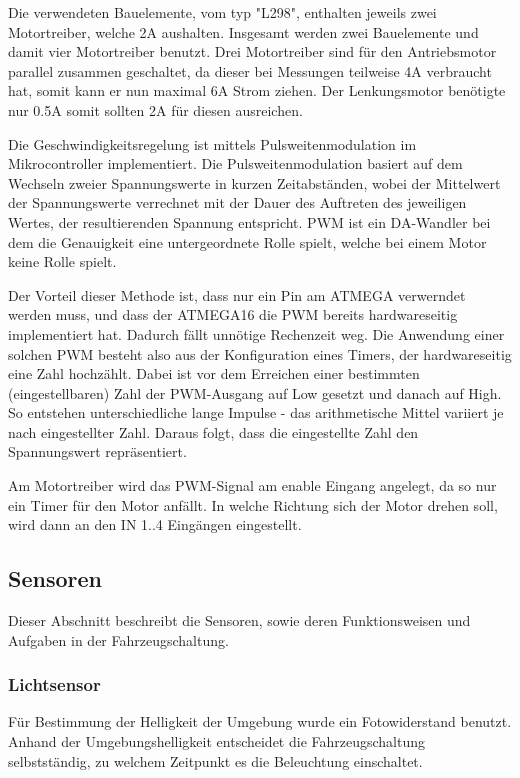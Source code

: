 \documentclass{scrartcl}
\begin{document}

		Die verwendeten Bauelemente, vom typ "L298", enthalten jeweils zwei Motortreiber, welche 2A aushalten.
		Insgesamt werden zwei Bauelemente und damit vier Motortreiber benutzt.
		Drei Motortreiber sind für den Antriebsmotor parallel zusammen geschaltet, da dieser 
		bei Messungen teilweise 4A verbraucht hat, somit kann er nun maximal 6A Strom ziehen.
		Der Lenkungsmotor benötigte nur 0.5A somit sollten 2A für diesen ausreichen.
				

		Die Geschwindigkeitsregelung ist mittels Pulsweitenmodulation im Mikrocontroller implementiert.
		Die Pulsweitenmodulation basiert auf dem Wechseln zweier Spannungswerte in kurzen Zeitabständen, wobei
		der Mittelwert der Spannungswerte verrechnet mit der Dauer des Auftreten des jeweiligen Wertes,
		der resultierenden Spannung entspricht.
		PWM ist ein DA-Wandler bei dem die Genauigkeit eine untergeordnete Rolle spielt, welche bei
		einem Motor keine Rolle spielt.

		Der Vorteil dieser Methode ist, dass nur ein Pin am ATMEGA verwerndet werden muss, und dass der ATMEGA16 die PWM
		bereits hardwareseitig implementiert hat. Dadurch fällt unnötige Rechenzeit weg.
		Die Anwendung einer solchen PWM besteht also aus der Konfiguration eines Timers,
		der hardwareseitig eine Zahl hochzählt. Dabei ist vor dem Erreichen einer bestimmten
		(eingestellbaren) Zahl der PWM-Ausgang auf Low gesetzt und danach auf High.
		So entstehen unterschiedliche lange Impulse - das arithmetische Mittel variiert je nach eingestellter Zahl.
		Daraus folgt, dass die eingestellte Zahl den Spannungswert repräsentiert.

		Am Motortreiber wird das PWM-Signal am enable Eingang angelegt, da so nur ein Timer für den Motor anfällt.
		In welche Richtung sich der Motor drehen soll, wird dann an den IN 1..4 Eingängen eingestellt.
		
	
	\subsection{Sensoren}
		Dieser Abschnitt beschreibt die Sensoren, sowie deren Funktionsweisen und Aufgaben
		in der Fahrzeugschaltung.
		\subsubsection{Lichtsensor} %
			Für Bestimmung der Helligkeit der Umgebung wurde ein Fotowiderstand benutzt.
			Anhand der Umgebungshelligkeit entscheidet die Fahrzeugschaltung selbstständig,
			zu welchem Zeitpunkt es die Beleuchtung einschaltet.
\end{document}
